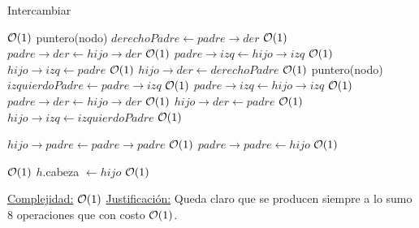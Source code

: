 \begin{Algoritmos}
\begin{algorithm}
\caption{Intercambiar}
\begin{algorithmic}[1]
   \Comment $\mathcal{O}(1)$
    \State puntero(nodo) $derechoPadre \gets padre \to der$ \Comment $\mathcal{O}(1)$
    \State $padre \to der \gets hijo \to der$ \Comment $\mathcal{O}(1)$
    \State $padre \to izq \gets hijo \to izq$ \Comment $\mathcal{O}(1)$
    \State $hijo \to izq \gets padre$ \Comment $\mathcal{O}(1)$
    \State $hijo \to der \gets derechoPadre$ \Comment $\mathcal{O}(1)$
  \Else
    \State puntero(nodo) $izquierdoPadre \gets padre \to izq$ \Comment $\mathcal{O}(1)$
    \State $padre \to izq \gets hijo \to izq$ \Comment $\mathcal{O}(1)$
    \State $padre \to der \gets hijo \to der$ \Comment $\mathcal{O}(1)$
    \State $hijo \to der \gets padre$ \Comment $\mathcal{O}(1)$
    \State $hijo \to izq \gets izquierdoPadre$ \Comment $\mathcal{O}(1)$
  \EndIf

  \State $hijo \to padre \gets padre \to padre$ \Comment $\mathcal{O}(1)$
  \State $padre \to padre \gets hijo$ \Comment $\mathcal{O}(1)$
  
   \Comment $\mathcal{O}(1)$
    \State$h$.cabeza $\gets hijo$ \Comment $\mathcal{O}(1)$
  \EndIf 


 \EndProcedure
 \underline{Complejidad:} $\mathcal{O}(1)$
 \underline{Justificación:} Queda claro que se producen siempre a lo sumo 8 operaciones que con costo $\mathcal{O}(1)$.
\end{algorithmic}
\end{algorithm}










\end{Algoritmos}











